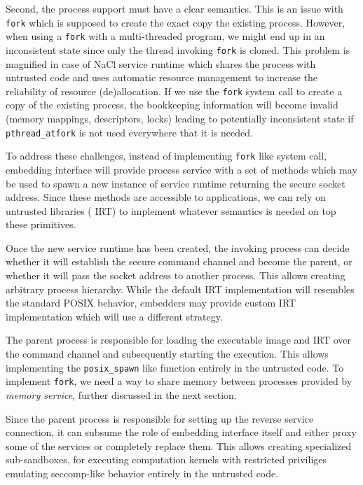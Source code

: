 Second, the process support must have a clear semantics. This is an
issue with \lstinline`fork` which is supposed to create the exact copy
the existing process. However, when using a \lstinline`fork` with a
multi-threaded program, we might end up in an inconsistent state since
only the thread invoking \lstinline`fork` is cloned.  This problem is
magnified in case of NaCl service runtime which shares the process with
untrusted code and uses automatic resource management to increase the
reliability of resource (de)allocation. If we use the \lstinline`fork`
system call to create a copy of the existing process, the bookkeeping
information will become invalid (\eg memory mappings, descriptors,
locks) leading to potentially inconsistent state if
\lstinline`pthread_atfork` is not used everywhere that it is needed.


To address these challenges, instead of implementing \lstinline`fork`
like system call, embedding interface will provide process service  with
a set of methods which may be used to spawn a new instance of
service runtime returning the secure socket address. Since these methods
are accessible to applications, we can rely on untrusted libraries (\eg
IRT) to implement whatever semantics is needed on top these primitives.

Once the new service runtime has been created, the invoking process can
decide whether it will establish the secure command channel and become
the parent, or whether it will pass the socket address to another
process.  This allows creating arbitrary process hierarchy.  While the
default IRT implementation will resembles the standard POSIX behavior,
embedders may provide custom IRT implementation which will use a
different strategy.

The parent process is responsible for loading the executable image and
IRT over the command channel and subsequently starting the execution.
This allows implementing the \lstinline`posix_spawn` like function
entirely in the untrusted code. To implement \lstinline`fork`, we need a
way to share memory between processes provided by \emph{memory service},
further discussed in the next section.

Since the parent process is responsible for setting up the reverse
service connection, it can subsume the role of embedding interface itself
and either proxy some of the services or completely replace them. This
allows creating specialized sub-sandboxes, \eg for executing computation
kernels with restricted priviliges emulating seccomp-like behavior
entirely in the untrusted code.

